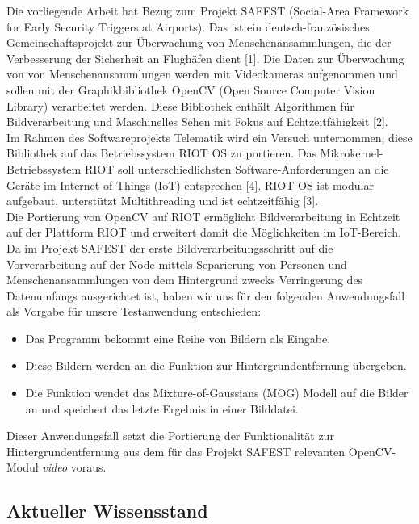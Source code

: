 \documentclass[10pt,a4paper]{article}
\begin{document}
Die vorliegende Arbeit hat Bezug zum Projekt SAFEST (Social-Area Framework for Early Security Triggers at Airports). Das ist ein deutsch-französisches Gemeinschaftsprojekt zur Überwachung von Menschenansammlungen, die der Verbesserung der Sicherheit an Flughäfen dient [1]. Die Daten zur Überwachung von von Menschenansammlungen werden mit Videokameras aufgenommen und sollen mit der Graphikbibliothek OpenCV (Open Source Computer Vision Library) verarbeitet werden. Diese Bibliothek enthält Algorithmen für Bildverarbeitung und Maschinelles Sehen mit Fokus auf Echtzeitfähigkeit [2]. \\

Im Rahmen des Softwareprojekts Telematik wird ein Versuch unternommen, diese Bibliothek auf das Betriebssystem RIOT OS zu portieren. Das Mikrokernel-Betriebssystem RIOT soll unterschiedlichsten Software-Anforderungen an die Geräte im Internet of Things (IoT) entsprechen [4]. RIOT OS ist modular aufgebaut, unterstützt Multithreading und ist echtzeitfähig [3]. \\

Die Portierung von OpenCV auf RIOT ermöglicht Bildverarbeitung in Echtzeit auf der Plattform RIOT und erweitert damit die Möglichkeiten im IoT-Bereich. \\

Da im Projekt SAFEST der erste Bildverarbeitungsschritt auf die Vorverarbeitung auf der Node mittels Separierung von Personen und Menschenansammlungen von dem Hintergrund zwecks Verringerung des Datenumfangs ausgerichtet ist, haben wir uns für den folgenden Anwendungsfall als Vorgabe für unsere Testanwendung entschieden: 

\begin{itemize}
\item Das Programm bekommt eine Reihe von Bildern als Eingabe.
\item Diese Bildern werden an die Funktion zur Hintergrundentfernung übergeben. 
\item Die Funktion wendet das Mixture-of-Gaussians (MOG) Modell auf die Bilder an und speichert das letzte Ergebnis in einer Bilddatei.
\end{itemize}

Dieser Anwendungsfall setzt die Portierung der Funktionalität zur Hintergrundentfernung aus dem für das Projekt SAFEST relevanten OpenCV-Modul {\it video} voraus.

\subsection{Aktueller Wissensstand}
\end{document}
